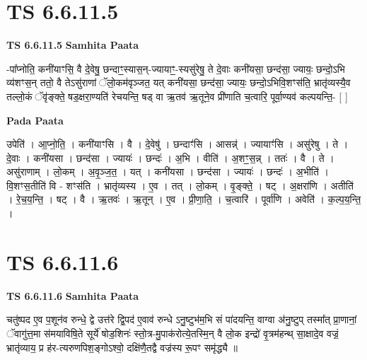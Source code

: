 \documentclass[17pt]{extarticle}
\begin{document}
\section*{ TS 6.6.11.5 }

\textbf{TS 6.6.11.5 } \newline
\textbf{Samhita Paata} \newline

-पा᳚प्नोति॒ कनी॑याꣳसि॒ वै दे॒वेषु॒ छन्दाꣳ॒॒स्यास॒न्-ज्यायाꣳ॒॒-स्यसु॑रेषु॒ ते दे॒वाः कनी॑यसा॒ छन्द॑सा॒ ज्यायः॒ छन्दो॒ऽभि व्य॑शꣳस॒न् ततो॒ वै तेऽसु॑राणां ॅलो॒कम॑वृञ्जत॒ यत् कनी॑यसा॒ छन्द॑सा॒ ज्यायः॒ छन्दो॒ऽभिवि॒शꣳस॑ति॒ भ्रातृ॑व्यस्यै॒व तल्लो॒कं ॅवृ॑ङ्क्ते॒ षड॒क्षरा॒ण्यति॑ रेचयन्ति॒ षड् वा ऋ॒तव॑ ऋ॒तूने॒व प्री॑णाति च॒त्वारि॒ पूर्वा॒ण्यव॑ कल्पयन्ति॒- [  ] \newline

\textbf{Pada Paata} \newline

उपेति॑ । आ॒प्नो॒ति॒ । कनी॑याꣳसि । वै । दे॒वेषु॑ । छन्दाꣳ॑सि । आसन्न्॑ । ज्यायाꣳ॑सि ।   असु॑रेषु । ते । दे॒वाः । कनी॑यसा । छन्द॑सा । ज्यायः॑ । छन्दः॑ । अ॒भि । वीति॑ । अ॒शꣳ॒॒स॒न्न् । ततः॑ । वै । ते । असु॑राणाम् । लो॒कम् । अ॒वृ॒ञ्ज॒त॒ । यत् । कनी॑यसा । छन्द॑सा । ज्यायः॑ । छन्दः॑ । अ॒भीति॑ । वि॒शꣳस॒तीति॑ वि - शꣳस॑ति । भ्रातृ॑व्यस्य । ए॒व । तत् । लो॒कम् । वृ॒ङ्क्ते॒ । षट् । अ॒क्षरा॑णि । अतीति॑ । रे॒च॒य॒न्ति॒ । षट् । वै । ऋ॒तवः॑ । ऋ॒तून् । ए॒व । प्री॒णा॒ति॒ । च॒त्वारि॑ । पूर्वा॑णि । अवेति॑ । क॒ल्प॒य॒न्ति॒ ।  \newline




\section*{ TS 6.6.11.6 }

\textbf{TS 6.6.11.6 } \newline
\textbf{Samhita Paata} \newline

चतु॑ष्पद ए॒व प॒शून॑व रुन्धे॒ द्वे उत्त॑रे द्वि॒पद॑ ए॒वाव॑ रुन्धे ऽनु॒ष्टुभ॑म॒भि सं पा॑दयन्ति॒ वाग्वा अ॑नु॒ष्टुप् तस्मा᳚त् प्रा॒णानां॒ ॅवागु॑त्त॒मा स॑मयाविषि॒ते सूर्ये॑ षोड॒शिनः॑ स्तो॒त्र-मु॒पाक॑रोत्ये॒तस्मि॒न् वै लो॒क इन्द्रो॑ वृ॒त्रम॑हन्थ् सा॒क्षादे॒व वज्रं॒ भ्रातृ॑व्याय॒ प्र ह॑र-त्यरुणपिश॒ङ्गोऽश्वो॒ दक्षि॑णै॒तद्वै वज्र॑स्य रू॒पꣳ समृ॑द्ध्यै ॥ \newline
\end{document}
